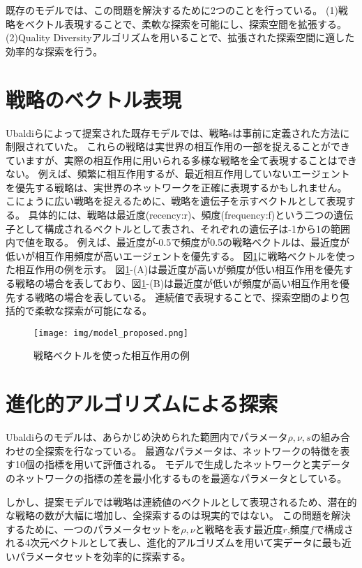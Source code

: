 \documentclass[uplatex,11pt,openany]{ujreport}
\begin{document}
    既存のモデルでは、この問題を解決するために2つのことを行っている。
    (1)戦略をベクトル表現することで、柔軟な探索を可能にし、探索空間を拡張する。
    (2)Quality Diversityアルゴリズムを用いることで、拡張された探索空間に適した効率的な探索を行う。

    \section{戦略のベクトル表現}
        Ubaldiらによって提案された既存モデルでは、戦略sは事前に定義された方法に制限されていた。
        これらの戦略は実世界の相互作用の一部を捉えることができていますが、実際の相互作用に用いられる多様な戦略を全て表現することはできない。
        例えば、頻繁に相互作用するが、最近相互作用していないエージェントを優先する戦略は、実世界のネットワークを正確に表現するかもしれません。
        こにょうに広い戦略を捉えるために、戦略を遺伝子を示すベクトルとして表現する。
        具体的には、戦略は最近度(recency:r)、頻度(frequency:f)という二つの遺伝子として構成されるベクトルとして表され、それぞれの遺伝子は-1から1の範囲内で値を取る。
        例えば、最近度が-0.5で頻度が0.5の戦略ベクトルは、最近度が低いが相互作用頻度が高いエージェントを優先する。
        図\ref{fig:strategy}に戦略ベクトルを使った相互作用の例を示す。
        図\ref{fig:strategy}-(A)は最近度が高いが頻度が低い相互作用を優先する戦略の場合を表しており、図\ref{fig:strategy}-(B)は最近度が低いが頻度が高い相互作用を優先する戦略の場合を表している。
        連続値で表現することで、探索空間のより包括的で柔軟な探索が可能になる。

        \begin{figure}[htbp]
            \centering
            \texttt{[image: img/model\_proposed.png]}
            \caption{戦略ベクトルを使った相互作用の例}
            \label{fig:strategy}
        \end{figure}

    \section{進化的アルゴリズムによる探索}
        Ubaldiらのモデルは、あらかじめ決められた範囲内でパラメータ$\rho,\nu,s$の組み合わせの全探索を行なっている。
        最適なパラメータは、ネットワークの特徴を表す10個の指標を用いて評価される。
        モデルで生成したネットワークと実データのネットワークの指標の差を最小化するものを最適なパラメータとしている。

        しかし、提案モデルでは戦略は連続値のベクトルとして表現されるため、潜在的な戦略の数が大幅に増加し、全探索するのは現実的ではない。
        この問題を解決するために、一つのパラメータセットを$\rho,\nu$と戦略を表す最近度$r$,頻度$f$で構成される4次元ベクトルとして表し、進化的アルゴリズムを用いて実データに最も近いパラメータセットを効率的に探索する。
\end{document}
